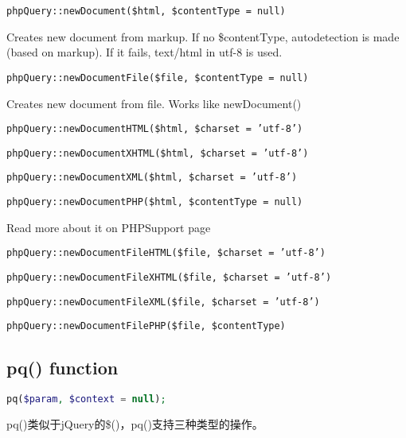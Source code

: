 \begin{compactitem}
\item \texttt{phpQuery::newDocument(\$html, \$contentType = null)}

Creates new document from markup. If no \$contentType, autodetection is made (based on markup). If it fails, text/html in utf-8 is used.
\item \texttt{phpQuery::newDocumentFile(\$file, \$contentType = null)} 

Creates new document from file. Works like newDocument()
\item \texttt{phpQuery::newDocumentHTML(\$html, \$charset = 'utf-8')}

\item \texttt{phpQuery::newDocumentXHTML(\$html, \$charset = 'utf-8')}

\item \texttt{phpQuery::newDocumentXML(\$html, \$charset = 'utf-8')}
\item \texttt{phpQuery::newDocumentPHP(\$html, \$contentType = null)}

Read more about it on PHPSupport page
\item \texttt{phpQuery::newDocumentFileHTML(\$file, \$charset = 'utf-8')}

\item \texttt{phpQuery::newDocumentFileXHTML(\$file, \$charset = 'utf-8')}
\item \texttt{phpQuery::newDocumentFileXML(\$file, \$charset = 'utf-8')}

\item \texttt{phpQuery::newDocumentFilePHP(\$file, \$contentType)}
\end{compactitem}


\subsection{pq() function}





\begin{lstlisting}[language=PHP]
pq($param, $context = null);
\end{lstlisting}

pq()类似于jQuery的\$()，pq()支持三种类型的操作。

